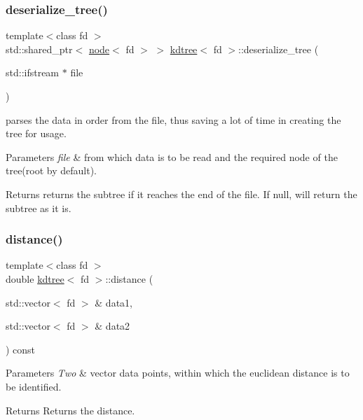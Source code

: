 \subsubsection{\texorpdfstring{deserialize\+\_\+tree()}{deserialize\_tree()}}
{\footnotesize\ttfamily template$<$class fd $>$ \\
std\+::shared\+\_\+ptr$<$ \hyperlink{classnode}{node}$<$ fd $>$ $>$ \hyperlink{classkdtree}{kdtree}$<$ fd $>$\+::deserialize\+\_\+tree (\begin{DoxyParamCaption}\item[{std\+::ifstream $\ast$}]{file }\end{DoxyParamCaption})}



parses the data in order from the file, thus saving a lot of time in creating the tree for usage. 


\begin{DoxyParams}{Parameters}
{\em file} & from which data is to be read and the required node of the tree(root by default). \\
\hline
\end{DoxyParams}
\begin{DoxyReturn}{Returns}
returns the subtree if it reaches the end of the file. If null, will return the subtree as it is. 
\end{DoxyReturn}
\mbox{\label{classkdtree_a9c74e7b92f12990844c7c5ec9e840c2f}} 
\subsubsection{\texorpdfstring{distance()}{distance()}}
{\footnotesize\ttfamily template$<$class fd $>$ \\
double \hyperlink{classkdtree}{kdtree}$<$ fd $>$\+::distance (\begin{DoxyParamCaption}\item[{std\+::vector$<$ fd $>$ \&}]{data1,  }\item[{std\+::vector$<$ fd $>$ \&}]{data2 }\end{DoxyParamCaption}) const}


\begin{DoxyParams}{Parameters}
{\em Two} & vector data points, within which the euclidean distance is to be identified. \\
\hline
\end{DoxyParams}
\begin{DoxyReturn}{Returns}
Returns the distance. 
\end{DoxyReturn}
\mbox{\label{classkdtree_a42af3021231ec8fceff78d6f309d2571}} 
